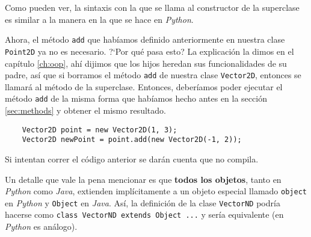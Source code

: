   Como pueden ver, la sintaxis con la que se llama al constructor de la superclase es 
  similar a la manera en la que se hace en \textit{Python}.

  Ahora, el método \texttt{add} que habíamos definido anteriormente en nuestra clase 
  \texttt{Point2D} ya no es necesario.
  ?`Por qué pasa esto?
  La explicación la dimos en el capítulo \ref{ch:oop}, ahí dijimos que los hijos heredan 
  sus funcionalidades de su padre, así que si borramos el método \texttt{add} de nuestra
  clase \texttt{Vector2D}, entonces se llamará al método de la superclase.
  Entonces, deberíamos poder ejecutar el método \texttt{add} de la misma forma que 
  habíamos hecho antes en la sección \ref{sec:methods} y obtener el mismo resultado.

  \begin{verbatim}
    Vector2D point = new Vector2D(1, 3);
    Vector2D newPoint = point.add(new Vector2D(-1, 2));
  \end{verbatim}

  Si intentan correr el código anterior se darán cuenta que no compila.
  

  \begin{note}
    Un detalle que vale la pena mencionar es que \textbf{todos los objetos}, tanto en 
    \textit{Python} como \textit{Java}, extienden implícitamente a un objeto especial 
    llamado \texttt{object} en \textit{Python} y \texttt{Object} en \textit{Java}.
    Así, la definición de la clase \texttt{VectorND} podría hacerse como 
    \texttt{class VectorND extends Object {...}} y sería equivalente 
    (en \textit{Python} es análogo).
  \end{note}
%